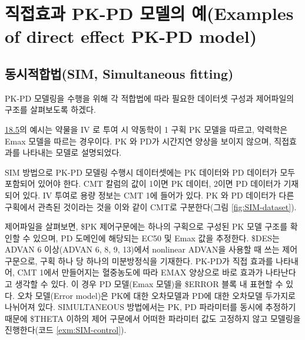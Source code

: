 \documentclass[
  10pt,
  krantz2,
  a4paper]{krantz}
\theoremstyle{definition}
\theoremstyle{definition}
\theoremstyle{definition}
\theoremstyle{remark}
\begin{document}
\hypertarget{direct-pkpd}{%
\section{직접효과 PK-PD 모델의 예(Examples of direct effect PK-PD model)}\label{direct-pkpd}}


\hypertarget{uxb3d9uxc2dcuxc801uxd569uxbc95sim-simultaneous-fitting}{%
\subsection{동시적합법(SIM, Simultaneous fitting)}\label{uxb3d9uxc2dcuxc801uxd569uxbc95sim-simultaneous-fitting}}


PK-PD 모델링을 수행을 위해 각 적합법에 따라 필요한 데이터셋 구성과 제어파일의 구조를 살펴보도록 하겠다.

\protect\hyperlink{direct-pkpd}{18.5}의 예시는 약물을 IV 로 투여 시 약동학이 1 구획 PK 모델을 따르고, 약력학은 Emax 모델을 따르는 경우이다. PK 와 PD가 시간지연 양상을 보이지 않으며, 직접효과를 나타내는 모델로 설명되었다.

SIM 방법으로 PK-PD 모델링 수행시 데이터셋에는 PK 데이터와 PD 데이터가 모두 포함되어 있어야 한다. CMT 칼럼의 값이 1이면 PK 데이터, 2이면 PD 데이터가 기재되어 있다. IV 투여로 용량 정보는 CMT 1에 들어가 있다. PK 와 PD 데이터가 다른 구획에서 관측된 것이라는 것을 이와 같이 CMT로 구분한다(그림 \ref{fig:SIM-dataset}).

제어파일을 살펴보면, \$PK 제어구문에는 하나의 구획으로 구성된 PK 모델 구조를 확인할 수 있으며, PD 도메인에 해당되는 EC50 및 Emax 값을 추정한다. \$DES는 ADVAN 6 이상(ADVAN 6, 8, 9, 13)에서 nonlinear ADVAN을 사용할 때 쓰는 제어구문으로, 구획 하나 당 하나의 미분방정식을 기재한다. PK-PD가 직접 효과를 나타내어, CMT 1에서 만들어지는 혈중농도에 따라 EMAX 양상으로 바로 효과가 나타난다고 생각할 수 있다. 이 경우 PD 모델(Emax 모델)을 \$ERROR 블록 내 표현할 수 있다. 오차 모델(Error model)은 PK에 대한 오차모델과 PD에 대한 오차모델 두가지로 나뉘어져 있다. SIMULTANEOUS 방법에서는 PK, PD 파라미터를 동시에 추정하기 때문에 \$THETA 이하의 제어 구문에서 어떠한 파라미터 값도 고정하지 않고 모델링을 진행한다(코드 \ref{exm:SIM-control}).
\end{document}
